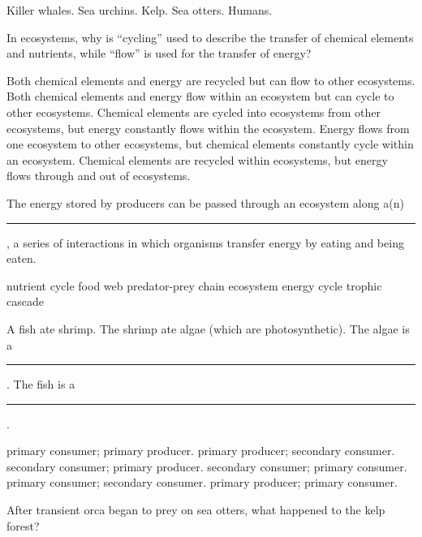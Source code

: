 \begin{choices}
\choice Killer whales. 
\choice Sea urchins.  
\choice Kelp.  
\correctchoice Sea otters. 
\choice Humans.  
\end{choices}

\question
In ecosystems, why is ``cycling'' used to describe the transfer of chemical elements and nutrients, while ``flow'' is used for the transfer of energy?

\begin{choices}
	\choice Both chemical elements and energy are recycled but can flow to other ecosystems.
	\choice Both chemical elements and energy flow within an ecosystem but can cycle to other ecosystems.
	\choice Chemical elements are cycled into ecosystems from other ecosystems, but energy constantly flows within the ecosystem.
	\choice Energy flows from one ecosystem to other ecosystems, but chemical elements constantly cycle within an ecosystem.
	\correctchoice Chemical elements are recycled within ecosystems, but energy flows through and out of ecosystems.
\end{choices}

\question
The energy stored by producers can be passed through an ecosystem along a(n) \rule{1in}{0.4pt}, a series of interactions in which organisms transfer energy by eating and being eaten.

\begin{choices}
\choice nutrient cycle 
\correctchoice food web 
\choice predator-prey chain  
\choice ecosystem 
\choice energy cycle 
\choice trophic cascade 
\end{choices}

\question
A fish ate shrimp. The shrimp ate algae (which are photosynthetic).  The algae is a \rule{1in}{0.4pt}. The fish is a \rule{1in}{0.4pt}.

\begin{choices}
	\choice primary consumer; primary producer. 
	\correctchoice primary producer; secondary consumer. 
	\choice secondary consumer; primary producer. 
	\choice secondary consumer; primary consumer. 
	\choice primary consumer; secondary consumer. 
	\choice primary producer; primary consumer. 
\end{choices}

\question
After transient orca began to prey on sea otters, what happened to the kelp forest?

